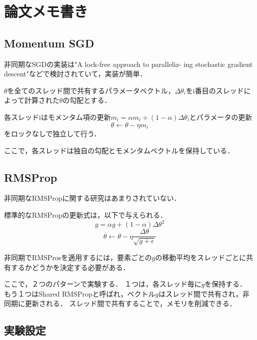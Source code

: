 \documentclass{jarticle}
\begin{document}
\section{論文メモ書き}

\subsection{Momentum SGD}
非同期なSGDの実装は"A lock-free approach to paralleliz- ing stochastic gradient descent"などで検討されていて，実装が簡単．

$\theta$を全てのスレッド間で共有するパラメータベクトル，$\Delta \theta_i$をi番目のスレッドによって計算された$\theta$の勾配とする．

各スレッドiはモメンタム項の更新$m_i=\alpha m_i+(1-\alpha)\Delta\theta_i$とパラメータの更新
$$\theta\gets\theta-\eta m_i$$
をロックなしで独立して行う．

ここで，各スレッドは独自の勾配とモメンタムベクトルを保持している．

\subsection{RMSProp}
非同期なRMSPropに関する研究はあまりされていない．

標準的なRMSPropの更新式は，以下で与えられる．
$$g=\alpha g + (1-\alpha)\Delta\theta^2$$
$$\theta \gets \theta - \eta \frac{\Delta\theta}{\sqrt{g+\epsilon}}$$

非同期でRMSProsを適用するには，要素ごとの$g$の移動平均をスレッドごとに共有するかどうかを決定する必要がある．

ここで，２つのパターンで実験する．
１つは，各スレッド毎に$g$を保持する．
もう１つはShared RMSPropと呼ばれ，ベクトル$g$はスレッド間で共有され，非同期に更新される．
スレッド間で共有することで，メモリを削減できる．

\subsection{実験設定}
\end{document}
